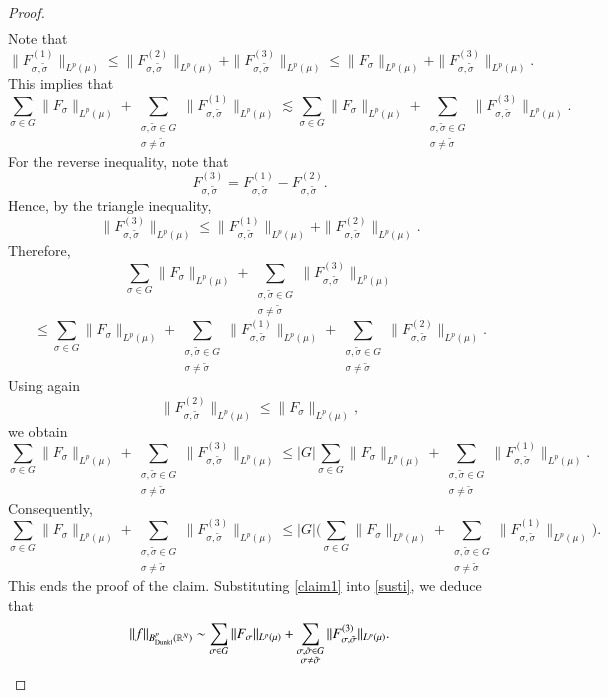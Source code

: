\documentclass[12pt]{amsart}
\begin{document}
\begin{proof}
\begin{align}
\end{align}
Note that
$$\|F_{\sigma,\tilde{\sigma}}^{(1)}\|_{L^p(\mu)}\leq \|F_{\sigma,\tilde{\sigma}}^{(2)}\|_{L^p(\mu)}+\|F_{\sigma,\tilde{\sigma}}^{(3)}\|_{L^p(\mu)}\leq \|F_{\sigma}\|_{L^p(\mu)}+\|F_{\sigma,\tilde{\sigma}}^{(3)}\|_{L^p(\mu)}.$$
This implies that
$$\sum_{\sigma\in G} \|F_{\sigma}\|_{L^p(\mu)}+\sum_{\substack{\sigma,\tilde{\sigma}\in G\\ \sigma\neq \tilde{\sigma}}}\|F_{\sigma,\tilde{\sigma}}^{(1)}\|_{L^p(\mu)}\lesssim \sum_{\sigma\in G} \|F_{\sigma}\|_{L^p(\mu)}+\sum_{\substack{\sigma,\tilde{\sigma}\in G\\ \sigma\neq \tilde{\sigma}}}\|F_{\sigma,\tilde{\sigma}}^{(3)}\|_{L^p(\mu)}.$$
For the reverse inequality, note that
\[
F_{\sigma,\tilde{\sigma}}^{(3)}
=
F_{\sigma,\tilde{\sigma}}^{(1)}-F_{\sigma,\tilde{\sigma}}^{(2)}.
\]
Hence, by the triangle inequality,
\[
\|F_{\sigma,\tilde{\sigma}}^{(3)}\|_{L^p(\mu)}
\le
\|F_{\sigma,\tilde{\sigma}}^{(1)}\|_{L^p(\mu)}
+
\|F_{\sigma,\tilde{\sigma}}^{(2)}\|_{L^p(\mu)}.
\]
Therefore,
\[
\sum_{\sigma\in G} \|F_{\sigma}\|_{L^p(\mu)}
+\sum_{\substack{\sigma,\tilde{\sigma}\in G\\ \sigma\neq \tilde{\sigma}}}
\|F_{\sigma,\tilde{\sigma}}^{(3)}\|_{L^p(\mu)}
\]
\[
\le
\sum_{\sigma\in G} \|F_{\sigma}\|_{L^p(\mu)}
+
\sum_{\substack{\sigma,\tilde{\sigma}\in G\\ \sigma\neq \tilde{\sigma}}}
\|F_{\sigma,\tilde{\sigma}}^{(1)}\|_{L^p(\mu)}
+
\sum_{\substack{\sigma,\tilde{\sigma}\in G\\ \sigma\neq \tilde{\sigma}}}
\|F_{\sigma,\tilde{\sigma}}^{(2)}\|_{L^p(\mu)}.
\]
Using again
\[
\|F_{\sigma,\tilde{\sigma}}^{(2)}\|_{L^p(\mu)}
\le
\|F_\sigma\|_{L^p(\mu)},
\]
we obtain
\[
\sum_{\sigma\in G} \|F_{\sigma}\|_{L^p(\mu)}
+\sum_{\substack{\sigma,\tilde{\sigma}\in G\\ \sigma\neq \tilde{\sigma}}}
\|F_{\sigma,\tilde{\sigma}}^{(3)}\|_{L^p(\mu)}
\le
|G|\sum_{\sigma\in G}\|F_\sigma\|_{L^p(\mu)}
+
\sum_{\substack{\sigma,\tilde{\sigma}\in G\\ \sigma\neq \tilde{\sigma}}}
\|F_{\sigma,\tilde{\sigma}}^{(1)}\|_{L^p(\mu)}.
\]
Consequently,
\[
\sum_{\sigma\in G} \|F_{\sigma}\|_{L^p(\mu)}
+\sum_{\substack{\sigma,\tilde{\sigma}\in G\\ \sigma\neq \tilde{\sigma}}}
\|F_{\sigma,\tilde{\sigma}}^{(3)}\|_{L^p(\mu)}
\le
|G|
\Biggl(
\sum_{\sigma\in G}\|F_\sigma\|_{L^p(\mu)}
+
\sum_{\substack{\sigma,\tilde{\sigma}\in G\\ \sigma\neq \tilde{\sigma}}}
\|F_{\sigma,\tilde{\sigma}}^{(1)}\|_{L^p(\mu)}
\Biggr).
\]
This ends the proof of the claim. Substituting \eqref{claim1} into \eqref{susti}, we deduce that
$$\|f\|_{B^{p}_{{\rm Dunkl}}(\mathbb{R}^N)}\sim \sum_{\sigma\in G} \|F_{\sigma}\|_{L^p(\mu)}+\sum_{\substack{\sigma,\tilde{\sigma}\in G\\ \sigma\neq \tilde{\sigma}}}\|F_{\sigma,\tilde{\sigma}}^{(3)}\|_{L^p(\mu)}.$$
\end{proof}
\end{document}
